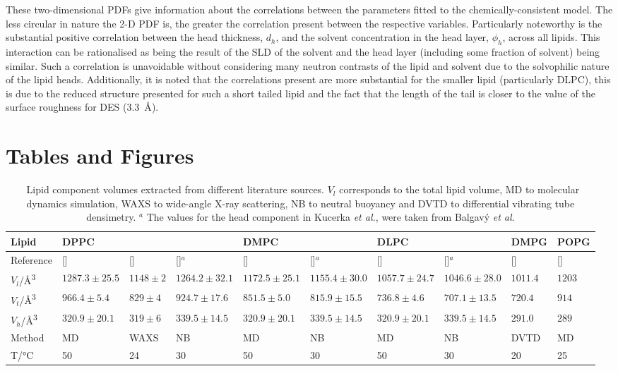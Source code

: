 \documentclass[11pt,a4paper]{paper}
\begin{document}
These two-dimensional PDFs give information about the correlations between the parameters fitted to the chemically-consistent model.
The less circular in nature the 2-D PDF is, the greater the correlation present between the respective variables.
Particularly noteworthy is the substantial positive correlation between the head thickness, $d_h$, and the solvent concentration in the head layer, $\phi_h$, across all lipids.
This interaction can be rationalised as being the result of the SLD of the solvent and the head layer (including some fraction of solvent) being similar.
Such a correlation is unavoidable without considering many neutron contrasts of the lipid and solvent due to the solvophilic nature of the lipid heads.
Additionally, it is noted that the correlations present are more substantial for the smaller lipid (particularly DLPC), this is due to the reduced structure presented for such a short tailed lipid and the fact that the length of the tail is closer to the value of the surface roughness for DES (\SI{3.3}{\angstrom}\cite{Sanchez-Fernandez2016}).

\section{Tables and Figures}

\begin{table}
  \centering
	\caption{\ Lipid component volumes extracted from different literature sources. $V_l$ corresponds to the total lipid volume, MD to molecular dynamics simulation, WAXS to wide-angle X-ray scattering, NB to neutral buoyancy and DVTD to differential vibrating tube densimetry. $^a$ The values for the head component in Kucerka \emph{et al.},\cite{Kucerka2004} were taken from Balgav\'{y} \emph{et al}.\cite{Balgavy2001}}
  \centering
	\label{tab:water}
	\begin{tabular}{l|lll|ll|ll|l|l}
    Lipid & DPPC & & & DMPC & & DLPC & & DMPG & POPG \\
    \hline
    Reference & [\cite{Armen1998}] & [\cite{Sun1994}] & [\cite{Kucerka2004,Balgavy2001}]$^a$ & [\cite{Armen1998}] & [\cite{Kucerka2004,Balgavy2001}]$^a$ & [\cite{Armen1998}] & [\cite{Kucerka2004,Balgavy2001}]$^a$ & [\cite{Pan2012}] & [\cite{Kucerka2012}] \\
    \hline
    $V_l$/\si{\angstrom^3} & $1287.3\pm25.5$ & $1148\pm2$ & $1264.2\pm32.1$ & $1172.5\pm25.1$ & $1155.4\pm30.0$ & $1057.7\pm24.7$ & $1046.6\pm28.0$ & $1011.4$ & $1203$ \\
    $V_t$/\si{\angstrom^3} & $966.4\pm5.4$ & $829\pm4$ & $924.7\pm17.6$ & $851.5\pm5.0$ & $815.9\pm15.5$ & $736.8\pm4.6$ & $707.1\pm13.5$ & $720.4$ & $914$ \\
    $V_h$/\si{\angstrom^3} & $320.9\pm20.1$ & $319\pm6$ & $339.5\pm14.5$ & $320.9\pm20.1$ & $339.5\pm14.5$ & $320.9\pm20.1$ & $339.5\pm14.5$ & $291.0$ & $289$ \\
    Method & MD & WAXS & NB & MD & NB & MD & NB & DVTD & MD \\
    T/\si{\celsius} & 50 & 24 & 30 & 50 & 30 & 50 & 30 & 20 & 25 \\
	\end{tabular}
\end{table}
\end{document}
